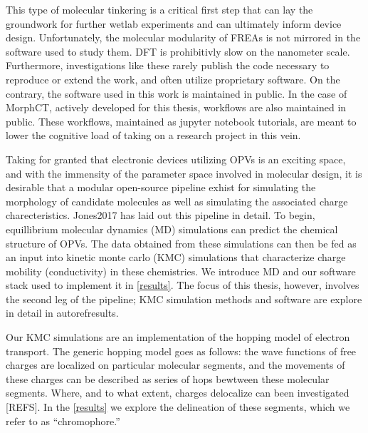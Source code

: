 This type of molecular tinkering is a critical first step that can lay the groundwork for further wetlab
experiments and can ultimately inform device design. Unfortunately, the molecular modularity of FREAs is not
mirrored in the software used to study them. DFT is prohibitivly slow on the nanometer
scale. Furthermore, investigations like these rarely publish the code necessary to reproduce or extend the
work, and often utilize proprietary software. On the contrary, the software used in this 
work is maintained in public. In the
case of MorphCT, actively developed for this thesis, workflows are
also maintained in public. These workflows, maintained as jupyter notebook tutorials, 
are meant to lower the cognitive load of taking on a research project in this vein. 

Taking for granted that electronic devices utilizing OPVs is an exciting
space, and with the immensity of the parameter space involved in molecular design, it is desirable that a modular
open-source pipeline exhist for simulating the morphology of candidate molecules as well as simulating the 
associated charge charecteristics. Jones2017 has laid out this
pipeline in detail. To begin, equillibrium molecular dynamics (MD) simulations can predict the chemical
structure of OPVs. The data obtained from these simulations can then be fed as an input into kinetic monte
carlo (KMC) simulations that characterize charge mobility (conductivity) in these chemistries. We introduce MD
and our software stack used to implement it in \autoref{results}. The focus of this thesis, however, involves
the second leg of the pipeline; KMC simulation methods and software are explore in detail in autoref{results}.

Our KMC simulations are an implementation of the hopping model of electron transport.
The generic hopping model goes as follows: the wave functions of
free charges are localized on particular molecular segments, and the movements of these charges can be described as series
of hops bewtween these molecular segments. Where, and to what extent, charges delocalize can been investigated
[REFS]. In the \autoref{results} we explore the delineation of these segments, which we refer to as
``chromophore.'' 

